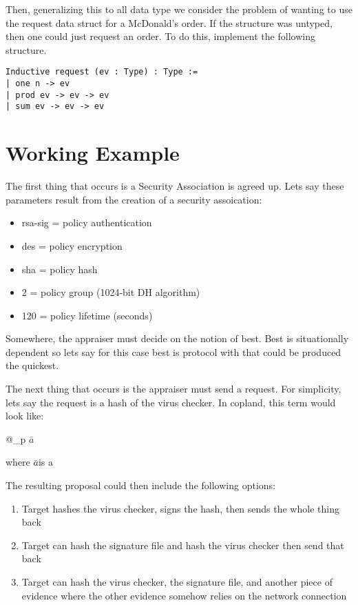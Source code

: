 \documentclass[10pt]{report}
\newcommand{\bara}[0]{$\mathit{\bar{a}}$}
\begin{document}
Then, generalizing this to all data type we consider the problem of wanting
to use the request data struct for a McDonald's order. If the structure was
untyped, then one could just request an order. To do this, implement the
following structure. 

\begin{verbatim}
Inductive request (ev : Type) : Type :=
| one n -> ev
| prod ev -> ev -> ev
| sum ev -> ev -> ev
\end{verbatim}

\section{Working Example}

The first thing that occurs is a Security Association is agreed up.
Lets say these parameters result from the creation of a security
assoication:

\begin{itemize}
\item rsa-sig = policy authentication
\item des = policy encryption
\item sha = policy hash
\item 2 = policy group (1024-bit DH algorithm)
\item 120 = policy lifetime (seconds)
\end{itemize}

Somewhere, the appraiser must decide on the notion of best. Best is
situationally dependent so lets say for this case best is protocol
with that could be produced the quickest. 

The next thing that occurs is the appraiser must send a request.
For simplicity, lets say the request is a hash of the virus checker. In
copland, this term would look like:

@_{p} \bara

where \bara  is a 

The resulting proposal could then include the following options:

\begin{enumerate}
\item Target hashes the virus checker, signs the hash, then sends the
  whole thing back
\item Target can hash the signature file and hash the virus checker
  then send that back
\item Target can hash the virus checker, the signature file, and another
  piece of evidence where the other evidence somehow relies on the network
  connection
\end{enumerate}
\end{document}
